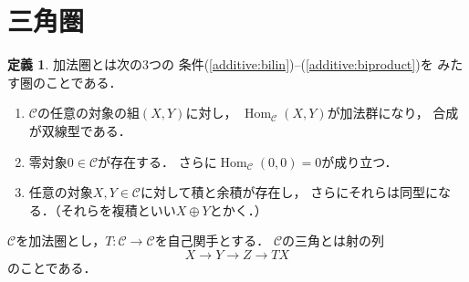 \documentclass[leqno, 10pt, a4paper, dvipdfmx]{jsarticle}
\theoremstyle{definition}
\newcommand{\Hom}{\mathop{\mathrm{Hom}}\nolimits} %
\numberwithin{equation}{section}
\newcommand{\cat}{\mathscr{C}}
\theoremstyle{mystyle}
\newtheorem{DFN}[AXM]{定義}
\begin{document}
\clearpage
\appendix

\section{三角圏}\label{ssec:tricat}

\begin{DFN}
    加法圏とは次の3つの
    条件(\ref{additive:bilin})--(\ref{additive:biproduct})を
    みたす圏のことである．
    \begin{enumerate}[(1)]
        \item \(\cat\)の任意の対象の組\((X, Y)\)に対し，
        \(\Hom_{\cat}(X,Y)\)が加法群になり，
        合成
        が双線型である．\label{additive:bilin}
        \item 零対象$0\in\cat$が存在する．
        さらに$\Hom_{\cat}(0,0)=0$が成り立つ．\label{additive:zero}
        \item 任意の対象$X, Y\in\cat$に対して積と余積が存在し，
        さらにそれらは同型になる．（それらを複積といい$X\oplus Y$とかく．）\label{additive:biproduct}
    \end{enumerate}
\end{DFN}

$\cat$を加法圏とし，$T\colon\cat\to\cat$を自己関手とする．
$\cat$の三角とは射の列
\begin{equation*}
    X\to Y\to Z\to TX
\end{equation*}
のことである．
\end{document}
